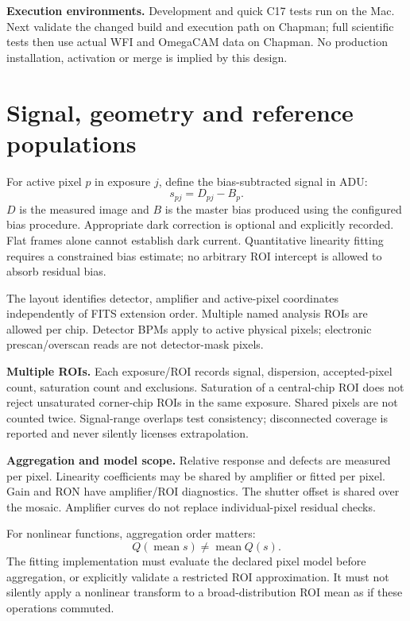 \documentclass[11pt,a4paper]{article}
\newcommand{\key}[1]{\textbf{\color{ink}#1}}
\newcommand{\nextpage}{\clearpage}
\begin{document}
\key{Execution environments.} Development and quick C17 tests run on the Mac. Next validate the changed build and execution path on Chapman; full scientific tests then use actual WFI and OmegaCAM data on Chapman. No production installation, activation or merge is implied by this design.

\nextpage
\section{Signal, geometry and reference populations}
For active pixel $p$ in exposure $j$, define the bias-subtracted signal in ADU:
\begin{equation} s_{pj}=D_{pj}-B_p. \end{equation}
$D$ is the measured image and $B$ is the master bias produced using the configured bias procedure. Appropriate dark correction is optional and explicitly recorded. Flat frames alone cannot establish dark current. Quantitative linearity fitting requires a constrained bias estimate; no arbitrary ROI intercept is allowed to absorb residual bias.

The layout identifies detector, amplifier and active-pixel coordinates independently of FITS extension order. Multiple named analysis ROIs are allowed per chip. Detector BPMs apply to active physical pixels; electronic prescan/overscan reads are not detector-mask pixels.

\key{Multiple ROIs.} Each exposure/ROI records signal, dispersion, accepted-pixel count, saturation count and exclusions. Saturation of a central-chip ROI does not reject unsaturated corner-chip ROIs in the same exposure. Shared pixels are not counted twice. Signal-range overlaps test consistency; disconnected coverage is reported and never silently licenses extrapolation.

\key{Aggregation and model scope.} Relative response and defects are measured per pixel. Linearity coefficients may be shared by amplifier or fitted per pixel. Gain and RON have amplifier/ROI diagnostics. The shutter offset is shared over the mosaic. Amplifier curves do not replace individual-pixel residual checks.

For nonlinear functions, aggregation order matters:
\begin{equation}Q(\operatorname{mean}s)\ne\operatorname{mean}Q(s).\end{equation}
The fitting implementation must evaluate the declared pixel model before aggregation, or explicitly validate a restricted ROI approximation. It must not silently apply a nonlinear transform to a broad-distribution ROI mean as if these operations commuted.
\end{document}
